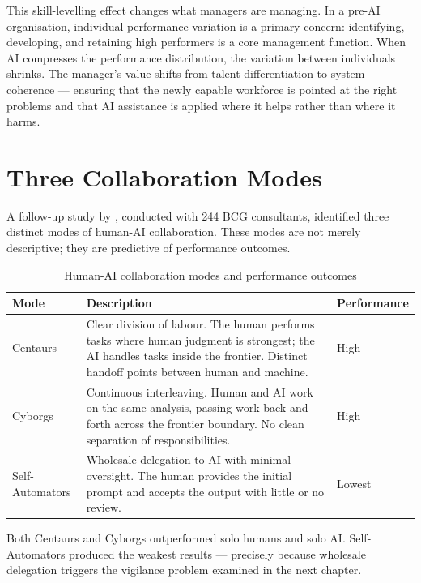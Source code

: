 This skill-levelling effect changes what managers are managing. In a pre-AI organisation, individual performance variation is a primary concern: identifying, developing, and retaining high performers is a core management function. When AI compresses the performance distribution, the variation between individuals shrinks. The manager's value shifts from talent differentiation to system coherence --- ensuring that the newly capable workforce is pointed at the right problems and that AI assistance is applied where it helps rather than where it harms.

\section{Three Collaboration Modes}

A follow-up study by \textcite{Randazzo2024}, conducted with 244 BCG consultants, identified three distinct modes of human-AI collaboration. These modes are not merely descriptive; they are predictive of performance outcomes.

\begin{table}[h]
\centering
\caption{Human-AI collaboration modes and performance outcomes}
\label{tab:collaboration-modes}
\begin{tabularx}{\textwidth}{l L{5cm} X}
\toprule
\textbf{Mode} & \textbf{Description} & \textbf{Performance} \\
\midrule
Centaurs & Clear division of labour. The human performs tasks where human judgment is strongest; the AI handles tasks inside the frontier. Distinct handoff points between human and machine. & High \\
\addlinespace
Cyborgs & Continuous interleaving. Human and AI work on the same analysis, passing work back and forth across the frontier boundary. No clean separation of responsibilities. & High \\
\addlinespace
Self-Automators & Wholesale delegation to AI with minimal oversight. The human provides the initial prompt and accepts the output with little or no review. & Lowest \\
\bottomrule
\end{tabularx}
\end{table}

Both Centaurs and Cyborgs outperformed solo humans and solo AI. Self-Automators produced the weakest results --- precisely because wholesale delegation triggers the vigilance problem examined in the next chapter.

